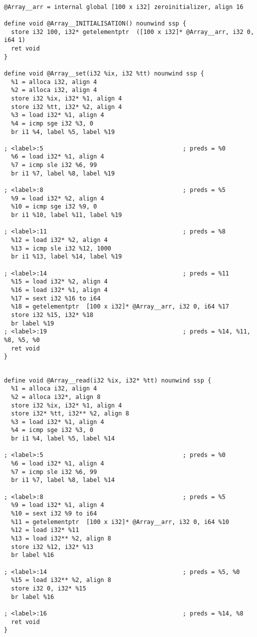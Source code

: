\documentclass[10pt,a4paper]{article}
\begin{document}
\begin{verbatim}

@Array__arr = internal global [100 x i32] zeroinitializer, align 16

define void @Array__INITIALISATION() nounwind ssp {
  store i32 100, i32* getelementptr  ([100 x i32]* @Array__arr, i32 0, i64 1)
  ret void
}

define void @Array__set(i32 %ix, i32 %tt) nounwind ssp {
  %1 = alloca i32, align 4
  %2 = alloca i32, align 4
  store i32 %ix, i32* %1, align 4
  store i32 %tt, i32* %2, align 4
  %3 = load i32* %1, align 4
  %4 = icmp sge i32 %3, 0
  br i1 %4, label %5, label %19

; <label>:5                                       ; preds = %0
  %6 = load i32* %1, align 4
  %7 = icmp sle i32 %6, 99
  br i1 %7, label %8, label %19

; <label>:8                                       ; preds = %5
  %9 = load i32* %2, align 4
  %10 = icmp sge i32 %9, 0
  br i1 %10, label %11, label %19

; <label>:11                                      ; preds = %8
  %12 = load i32* %2, align 4
  %13 = icmp sle i32 %12, 1000
  br i1 %13, label %14, label %19

; <label>:14                                      ; preds = %11
  %15 = load i32* %2, align 4
  %16 = load i32* %1, align 4
  %17 = sext i32 %16 to i64
  %18 = getelementptr  [100 x i32]* @Array__arr, i32 0, i64 %17
  store i32 %15, i32* %18
  br label %19
; <label>:19                                      ; preds = %14, %11, %8, %5, %0
  ret void
}
\end{verbatim}


\begin{verbatim}

define void @Array__read(i32 %ix, i32* %tt) nounwind ssp {
  %1 = alloca i32, align 4
  %2 = alloca i32*, align 8
  store i32 %ix, i32* %1, align 4
  store i32* %tt, i32** %2, align 8
  %3 = load i32* %1, align 4
  %4 = icmp sge i32 %3, 0
  br i1 %4, label %5, label %14

; <label>:5                                       ; preds = %0
  %6 = load i32* %1, align 4
  %7 = icmp sle i32 %6, 99
  br i1 %7, label %8, label %14

; <label>:8                                       ; preds = %5
  %9 = load i32* %1, align 4
  %10 = sext i32 %9 to i64
  %11 = getelementptr  [100 x i32]* @Array__arr, i32 0, i64 %10
  %12 = load i32* %11
  %13 = load i32** %2, align 8
  store i32 %12, i32* %13
  br label %16

; <label>:14                                      ; preds = %5, %0
  %15 = load i32** %2, align 8
  store i32 0, i32* %15
  br label %16

; <label>:16                                      ; preds = %14, %8
  ret void
}
\end{verbatim}
\end{document}
